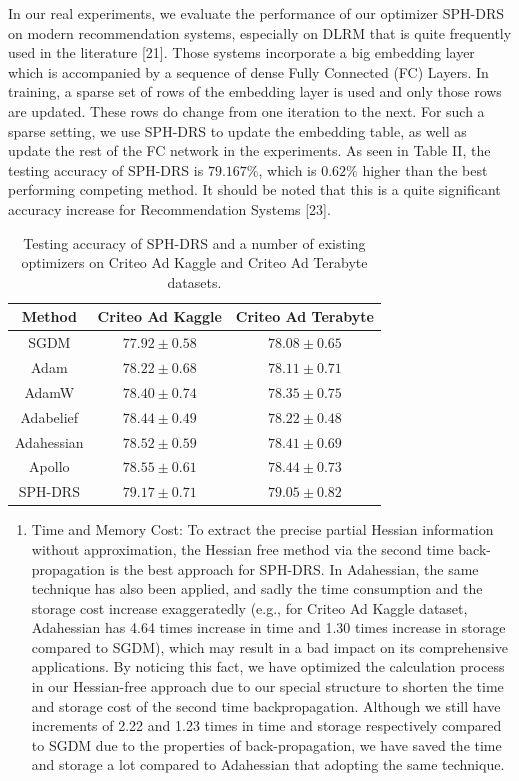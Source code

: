 \documentclass[conference]{IEEEtran}
\begin{document}
In our real experiments, we evaluate the performance of our optimizer SPH-DRS on modern recommendation systems, especially on DLRM that is quite frequently used in the literature [21]. Those systems incorporate a big embedding layer which is accompanied by a sequence of dense Fully Connected (FC) Layers. In training, a sparse set of rows of the embedding layer is used and only those rows are updated. These rows do change from one iteration to the next. For such a sparse setting, we use SPH-DRS to update the embedding table, as well as update the rest of the FC network in the experiments. As seen in Table II, the testing accuracy of SPH-DRS is $79.167 \%$, which is $0.62 \%$ higher than the best performing competing method. It should be noted that this is a quite significant accuracy increase for Recommendation Systems [23].

\begin{table}
\centering
\begin{tabular}{ccc}
\hline
Method & Criteo Ad Kaggle & Criteo Ad Terabyte \\
\hline
SGDM & $77.92 \pm 0.58$ & $78.08 \pm 0.65$ \\
Adam & $78.22 \pm 0.68$ & $78.11 \pm 0.71$ \\
AdamW & $78.40 \pm 0.74$ & $78.35 \pm 0.75$ \\
Adabelief & $78.44 \pm 0.49$ & $78.22 \pm 0.48$ \\
Adahessian & $78.52 \pm 0.59$ & $78.41 \pm 0.69$ \\
Apollo & $78.55 \pm 0.61$ & $78.44 \pm 0.73$ \\
SPH-DRS & $79.17 \pm 0.71$ & $79.05 \pm 0.82$ \\
\hline
\end{tabular}
\caption{Testing accuracy of SPH-DRS and a number of existing optimizers on Criteo Ad Kaggle and Criteo Ad Terabyte datasets.}
\end{table}

\begin{enumerate}
  \item Time and Memory Cost: To extract the precise partial Hessian information without approximation, the Hessian free method via the second time back-propagation is the best approach for SPH-DRS. In Adahessian, the same technique has also been applied, and sadly the time consumption and the storage cost increase exaggeratedly (e.g., for Criteo Ad Kaggle dataset, Adahessian has 4.64 times increase in time and 1.30 times increase in storage compared to SGDM), which may result in a bad impact on its comprehensive applications. By noticing this fact, we have optimized the calculation process in our Hessian-free approach due to our special structure to shorten the time and storage cost of the second time backpropagation. Although we still have increments of 2.22 and 1.23 times in time and storage respectively compared to SGDM due to the properties of back-propagation, we have saved the time and storage a lot compared to Adahessian that adopting the same technique.
\end{enumerate}
\end{document}
